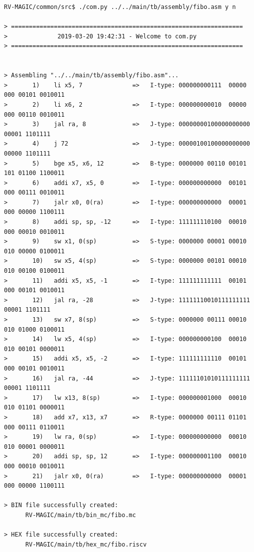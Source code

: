 \begingroup
    \fontsize{9pt}{12pt}\selectfont
    \begin{verbatim}  
RV-MAGIC/common/src$ ./com.py ../../main/tb/assembly/fibo.asm y n

> =================================================================
>              2019-03-20 19:42:31 - Welcome to com.py
> =================================================================


> Assembling "../../main/tb/assembly/fibo.asm"...
>       1)    li x5, 7              =>   I-type: 000000000111  00000 000 00101 0010011
>       2)    li x6, 2              =>   I-type: 000000000010  00000 000 00110 0010011
>       3)    jal ra, 8             =>   J-type: 00000000100000000000    00001 1101111
>       4)    j 72                  =>   J-type: 00000100100000000000    00000 1101111
>       5)    bge x5, x6, 12        =>   B-type: 0000000 00110 00101 101 01100 1100011
>       6)    addi x7, x5, 0        =>   I-type: 000000000000  00101 000 00111 0010011
>       7)    jalr x0, 0(ra)        =>   I-type: 000000000000  00001 000 00000 1100111
>       8)    addi sp, sp, -12      =>   I-type: 111111110100  00010 000 00010 0010011
>       9)    sw x1, 0(sp)          =>   S-type: 0000000 00001 00010 010 00000 0100011
>       10)   sw x5, 4(sp)          =>   S-type: 0000000 00101 00010 010 00100 0100011
>       11)   addi x5, x5, -1       =>   I-type: 111111111111  00101 000 00101 0010011
>       12)   jal ra, -28           =>   J-type: 11111110010111111111    00001 1101111
>       13)   sw x7, 8(sp)          =>   S-type: 0000000 00111 00010 010 01000 0100011
>       14)   lw x5, 4(sp)          =>   I-type: 000000000100  00010 010 00101 0000011
>       15)   addi x5, x5, -2       =>   I-type: 111111111110  00101 000 00101 0010011
>       16)   jal ra, -44           =>   J-type: 11111101010111111111    00001 1101111
>       17)   lw x13, 8(sp)         =>   I-type: 000000001000  00010 010 01101 0000011
>       18)   add x7, x13, x7       =>   R-type: 0000000 00111 01101 000 00111 0110011
>       19)   lw ra, 0(sp)          =>   I-type: 000000000000  00010 010 00001 0000011
>       20)   addi sp, sp, 12       =>   I-type: 000000001100  00010 000 00010 0010011
>       21)   jalr x0, 0(ra)        =>   I-type: 000000000000  00001 000 00000 1100111

> BIN file successfully created:
      RV-MAGIC/main/tb/bin_mc/fibo.mc

> HEX file successfully created:
      RV-MAGIC/main/tb/hex_mc/fibo.riscv
    \end{verbatim}  
\endgroup

